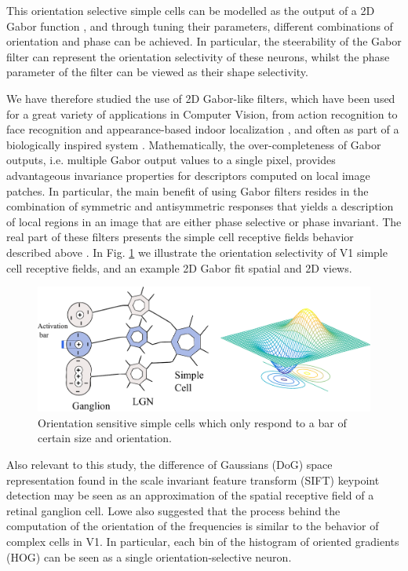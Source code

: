 This orientation selective simple cells can be modelled as the output of a 2D Gabor function \cite{daugman1985uncertainty}, and through tuning their parameters, different combinations of orientation and phase can be achieved. In particular, the steerability of the Gabor filter can represent the orientation selectivity of these neurons, whilst the phase parameter of the filter can be viewed as their shape selectivity. 

We have therefore studied the use of 2D Gabor-like filters, which have been used for a great variety of applications in Computer Vision, from action recognition \cite{shu2014bio} to face recognition \cite{liao2013partial} and appearance-based indoor localization \cite{rivera2015appearance}, and often as part of a biologically inspired system \cite{shu2014bio}. Mathematically, the over-completeness of Gabor outputs, i.e. multiple Gabor output values to a single pixel, provides advantageous invariance properties for descriptors computed on local image patches. In particular, the main benefit of using Gabor filters resides in the combination of symmetric and antisymmetric responses that yields a description of local regions in an image that are either phase selective or phase invariant. The real part of these filters presents the simple cell receptive fields behavior described above \cite{jones1987evaluation}. In Fig. \ref{fig:simple_cell} we illustrate the orientation selectivity of V1 simple cell receptive fields, and an example 2D Gabor fit spatial and 2D views.


\begin{figure}[h]
\centering
\includegraphics[width=.8\textwidth]{./gfx/Chapter05//simple_cell_gabor.pdf}
\caption{Orientation sensitive simple cells which only respond to a bar of certain size and orientation.}
\label{fig:simple_cell}
\end{figure}

Also relevant to this study, the difference of Gaussians (DoG) space representation found in the scale invariant feature transform (SIFT) keypoint detection \cite{lowe2004distinctive} may be seen as an approximation of the spatial receptive field of a retinal ganglion cell. Lowe also suggested that the process behind the computation of the orientation of the frequencies is similar to the behavior of complex cells in V1. In particular, each bin of the histogram of oriented gradients (HOG) can be seen as a single orientation-selective neuron.

